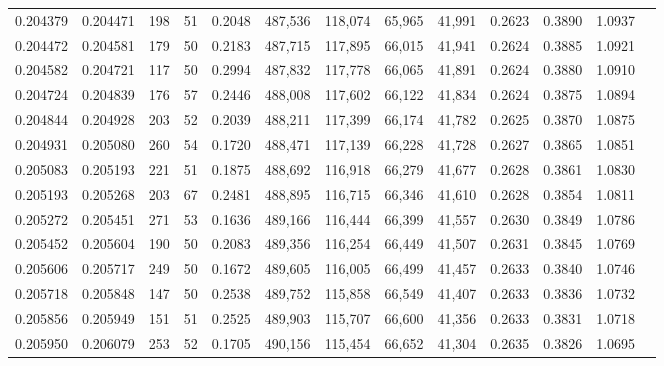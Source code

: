 \begin{tabular}{rrrrrrrrrrrrr}
0.204379 & 0.204471 &   198 &  51 &                                     0.2048 & 487,536 & 118,074 &  65,965 &  41,991 & 0.2623 & 0.3890 & 1.0937 \\
0.204472 & 0.204581 &   179 &  50 &                                     0.2183 & 487,715 & 117,895 &  66,015 &  41,941 & 0.2624 & 0.3885 & 1.0921 \\
0.204582 & 0.204721 &   117 &  50 &                                     0.2994 & 487,832 & 117,778 &  66,065 &  41,891 & 0.2624 & 0.3880 & 1.0910 \\
0.204724 & 0.204839 &   176 &  57 &                                     0.2446 & 488,008 & 117,602 &  66,122 &  41,834 & 0.2624 & 0.3875 & 1.0894 \\
0.204844 & 0.204928 &   203 &  52 &                                     0.2039 & 488,211 & 117,399 &  66,174 &  41,782 & 0.2625 & 0.3870 & 1.0875 \\
0.204931 & 0.205080 &   260 &  54 &                                     0.1720 & 488,471 & 117,139 &  66,228 &  41,728 & 0.2627 & 0.3865 & 1.0851 \\
0.205083 & 0.205193 &   221 &  51 &                                     0.1875 & 488,692 & 116,918 &  66,279 &  41,677 & 0.2628 & 0.3861 & 1.0830 \\
0.205193 & 0.205268 &   203 &  67 &                                     0.2481 & 488,895 & 116,715 &  66,346 &  41,610 & 0.2628 & 0.3854 & 1.0811 \\
0.205272 & 0.205451 &   271 &  53 &                                     0.1636 & 489,166 & 116,444 &  66,399 &  41,557 & 0.2630 & 0.3849 & 1.0786 \\
0.205452 & 0.205604 &   190 &  50 &                                     0.2083 & 489,356 & 116,254 &  66,449 &  41,507 & 0.2631 & 0.3845 & 1.0769 \\
0.205606 & 0.205717 &   249 &  50 &                                     0.1672 & 489,605 & 116,005 &  66,499 &  41,457 & 0.2633 & 0.3840 & 1.0746 \\
0.205718 & 0.205848 &   147 &  50 &                                     0.2538 & 489,752 & 115,858 &  66,549 &  41,407 & 0.2633 & 0.3836 & 1.0732 \\
0.205856 & 0.205949 &   151 &  51 &                                     0.2525 & 489,903 & 115,707 &  66,600 &  41,356 & 0.2633 & 0.3831 & 1.0718 \\
0.205950 & 0.206079 &   253 &  52 &                                     0.1705 & 490,156 & 115,454 &  66,652 &  41,304 & 0.2635 & 0.3826 & 1.0695 \\

\end{tabular}
